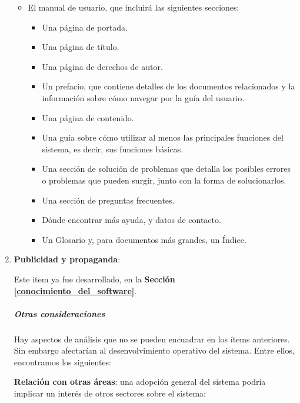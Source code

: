 \begin{enumerate}
\begin{itemize}
        \item El manual de usuario, que incluirá las siguientes secciones:
        \begin{itemize}
            \item   Una página de portada.
            \item   Una página de título.
            \item   Una página de derechos de autor.
            \item   Un prefacio, que contiene detalles de los documentos relacionados y la información sobre cómo navegar por la guía del usuario.
            \item   Una página de contenido.
            \item   Una guía sobre cómo utilizar al menos las principales funciones del sistema, es decir, sus funciones básicas.
            \item   Una sección de solución de problemas que detalla los posibles errores o problemas que pueden surgir, junto con la forma de solucionarlos.
            \item   Una sección de preguntas frecuentes.
            \item   Dónde encontrar más ayuda, y datos de contacto.
            \item   Un Glosario y, para documentos más grandes, un Índice.
        \end{itemize}
	\end{itemize}

\item \textbf{Publicidad y propaganda}:

Este item ya fue desarrollado, en la \textbf{Sección \ref{conocimiento_del_software}}.


\subparagraph{Otras consideraciones}

	Hay aspectos de análisis que no se pueden encuadrar en los ítems anteriores.
    Sin embargo afectarían al desenvolvimiento operativo del sistema.
    Entre ellos, encontramos los siguientes:
    
    \textbf{Relación con otras áreas}: una adopción general del sistema podría implicar un interés de otros sectores sobre el sistema:
    

\end{enumerate}
